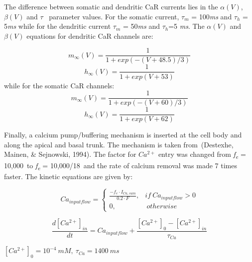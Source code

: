\documentclass[a4paper,12pt]{article}
\begin{document}
The difference between somatic and dendritic CaR currents lies in the $\alpha(V)$, $\beta(V)$ and $\tau$ ~parameter
values. For the somatic current, $\tau_m$ = 100\textit{ms} and
$\tau_h$ = 5\textit{ms} while for the dendritic current $\tau_m$ = 50\textit{ms} and $\tau_h$=5 \textit{ ms}. The $\alpha(V)$ and $\beta(V)$ equations for dendritic CaR channels are:


\begin{equation}
m_{\infty}(V)=\frac {1}{1+exp(-(V+48.5)/3)}
\end{equation}
\begin{equation}
h_{\infty}(V)=\frac {1}{1+exp(V+53)}
\end{equation}
while for the somatic CaR channels:
\begin{equation}
m_{\infty}(V)=\frac {1}{1+exp(-(V+60)/3)}
\end{equation}
\begin{equation}
h_{\infty}(V)=\frac {1}{1+exp(V+62)}
\end{equation}

Finally, a calcium pump/buffering mechanism is inserted at the cell body and along the apical and basal trunk. The
mechanism is taken from~(Destexhe, Mainen, \& Sejnowski, 1994). The factor for
$Ca^{2+}$ entry was changed from
\textit{f\textsubscript{e}} = 10,000~to \textit{f\textsubscript{e}} = 10,000/18~and the rate of calcium removal was made 7 times faster. The kinetic equations are given by:

\begin{equation}
Ca_{input flow} = \begin{cases} \frac{-f_e \cdot I_{Ca, sum} }{0.2 \cdot F}, & if \ Ca_{input flow} > 0  \\ 0, & \  otherwise \ \end{cases}
\end{equation}

\begin{equation}
\frac{d[Ca^{2+}]_{in}}{dt}=Ca_{input flow} +\frac{[Ca^{2+}]_{0}-[Ca^{2+}]_{in}}{\tau_{Ca}}
\end{equation}

$[Ca^{2+}]_{0} = 10^{-4} \ mM, \ \tau_{Ca} = 1400 \ ms$


\bigskip
\end{document}
